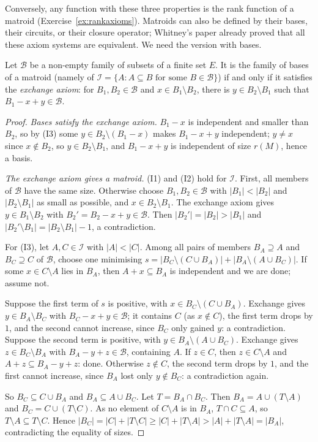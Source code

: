 Conversely, any function with these three properties is the rank function of a matroid (Exercise~\ref{ex:rankaxioms}). Matroids can also be defined by their bases, their circuits, or their closure
operator; Whitney's paper already proved that all these axiom systems are equivalent. We need the version with bases.

\begin{theorem}[bases]\label{thm:bases}
Let $\mathcal B$ be a non-empty family of subsets of a finite set $E$. It is the family of bases of a matroid (namely of $\mathcal I=\{A:A\subseteq B\text{ for some }B\in\mathcal B\}$) if and only if it satisfies the
\emph{exchange axiom}: for $B_1,B_2\in\mathcal B$ and $x\in B_1\setminus B_2$, there is $y\in B_2\setminus B_1$ such that $B_1-x+y\in\mathcal B$.
\end{theorem}
\begin{proof}
\emph{Bases satisfy the exchange axiom.} $B_1-x$ is independent and smaller than $B_2$, so by (I3) some $y\in B_2\setminus(B_1-x)$ makes $B_1-x+y$ independent; $y\neq x$ since $x\notin B_2$, so $y\in B_2\setminus B_1$, and
$B_1-x+y$ is independent of size $r(M)$, hence a basis.

\emph{The exchange axiom gives a matroid.} (I1) and (I2) hold for $\mathcal I$. First, all members of $\mathcal B$ have the same size. Otherwise choose $B_1,B_2\in\mathcal B$ with $|B_1|<|B_2|$ and $|B_2\setminus B_1|$
as small as possible, and $x\in B_2\setminus B_1$. The exchange axiom gives $y\in B_1\setminus B_2$ with $B_2'=B_2-x+y\in\mathcal B$. Then $|B_2'|=|B_2|>|B_1|$ and $|B_2'\setminus B_1|=|B_2\setminus B_1|-1$, a contradiction.

For (I3), let $A,C\in\mathcal I$ with $|A|<|C|$. Among all pairs of members $B_A\supseteq A$ and $B_C\supseteq C$ of $\mathcal B$, choose one minimising $s=|B_C\setminus(C\cup B_A)|+|B_A\setminus(A\cup B_C)|$. If some
$x\in C\setminus A$ lies in $B_A$, then $A+x\subseteq B_A$ is independent and we are done; assume not.

Suppose the first term of $s$ is positive, with $x\in B_C\setminus(C\cup B_A)$. Exchange gives $y\in B_A\setminus B_C$ with $B_C-x+y\in\mathcal B$; it contains $C$ (as $x\notin C$), the first term drops by $1$,
and the second cannot increase, since $B_C$ only gained $y$: a contradiction. Suppose the second term is positive, with $y\in B_A\setminus(A\cup B_C)$. Exchange gives $z\in B_C\setminus B_A$ with
$B_A-y+z\in\mathcal B$, containing $A$. If $z\in C$, then $z\in C\setminus A$ and $A+z\subseteq B_A-y+z$: done. Otherwise $z\notin C$, the second term drops by $1$, and the first cannot increase,
since $B_A$ lost only $y\notin B_C$: a contradiction again.

So $B_C\subseteq C\cup B_A$ and $B_A\subseteq A\cup B_C$. Let $T=B_A\cap B_C$. Then $B_A=A\cup(T\setminus A)$ and $B_C=C\cup(T\setminus C)$. As no element of $C\setminus A$ is in $B_A$, $T\cap C\subseteq A$, so
$T\setminus A\subseteq T\setminus C$. Hence $|B_C|=|C|+|T\setminus C|\ge|C|+|T\setminus A|>|A|+|T\setminus A|=|B_A|$, contradicting the equality of sizes.
\end{proof}

